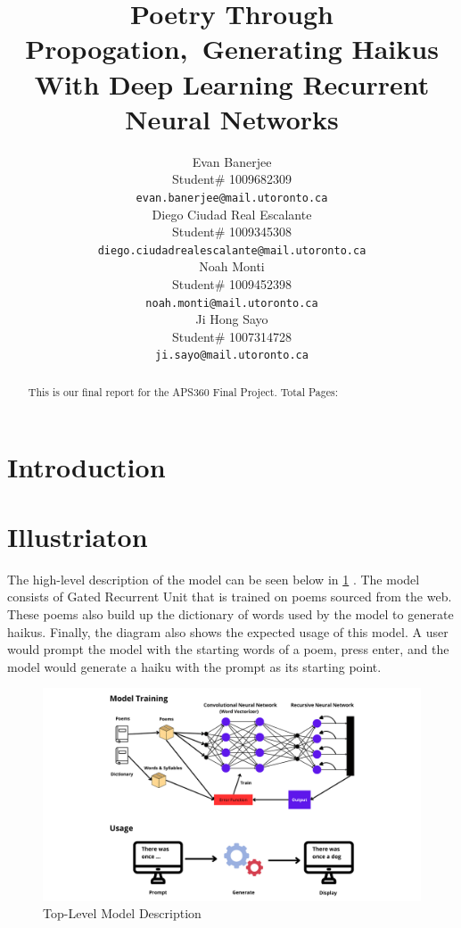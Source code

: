 \documentclass{article} %
\title{Poetry Through Propogation,\ Generating Haikus With Deep Learning Recurrent Neural Networks}
\author{Evan Banerjee  \\
Student\# 1009682309\\
\texttt{evan.banerjee@mail.utoronto.ca} \\
\And
Diego Ciudad Real Escalante  \\
Student\# 1009345308 \\
\texttt{diego.ciudadrealescalante@mail.utoronto.ca} \\
\AND
Noah Monti  \\
Student\# 1009452398 \\
\texttt{noah.monti@mail.utoronto.ca} \\
\And
Ji Hong Sayo \\
Student\# 1007314728 \\
\texttt{ji.sayo@mail.utoronto.ca} \\
\AND
}
\begin{document}
\maketitle

\begin{abstract}
This is our final report for the APS360 Final Project.
Total Pages: \pageref{last_page}
\end{abstract}

\section{Introduction}

\section{Illustriaton}
The high-level description of the model can be seen below in \ref{fig:model_diagram} .
The model consists of Gated Recurrent Unit that is trained on poems sourced from the web.
These poems also build up the dictionary of words used by the model to generate haikus.
Finally, the diagram also shows the expected usage of this model.
A user would prompt the model with the starting words of a poem, press enter,
and the model would generate a haiku with the prompt as its starting point.



\begin{figure}[h]
  \begin{center}
  \includegraphics[width=1\textwidth]{Figs/model_diagram.png}
  \end{center}
  \caption{Top-Level Model Description}
  \label{fig:model_diagram}
\end{figure}
\end{document}
